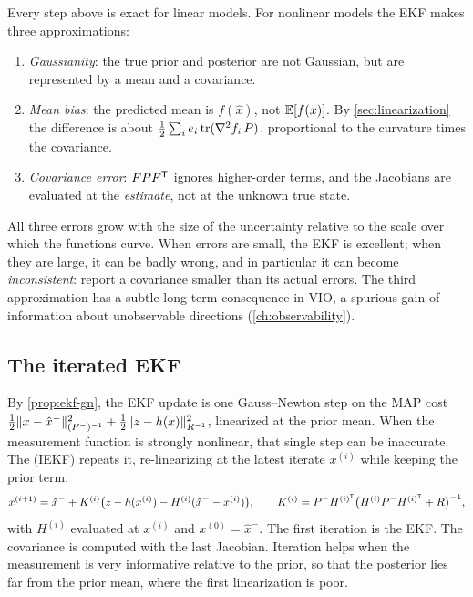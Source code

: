 Every step above is exact for linear models. For nonlinear models the EKF makes three approximations:
\begin{enumerate}
  \item \emph{Gaussianity}: the true prior and posterior are not Gaussian, but are represented by a mean and a covariance.
  \item \emph{Mean bias}: the predicted mean is $f(\hat x)$, not $\mathbb{E}[f(x)]$. By \cref{sec:linearization} the difference is about
        $\tfrac12\sum_ie_i\operatorname{tr}(\nabla^2f_i\,P)$, proportional to the curvature times the covariance.
  \item \emph{Covariance error}: $FPF^{\mathsf{T}}$ ignores higher-order terms, and the Jacobians are evaluated at the \emph{estimate}, not at the unknown true state.
\end{enumerate}
All three errors grow with the size of the uncertainty relative to the scale over which the functions curve. When errors are small, the EKF is
excellent; when they are large, it can be badly wrong, and in particular it can become \emph{inconsistent}: report a covariance smaller than its
actual errors. The third approximation has a subtle long-term consequence in VIO, a spurious gain of information about unobservable directions
(\cref{ch:observability}).

\subsection{The iterated EKF}

By \cref{prop:ekf-gn}, the EKF update is one Gauss--Newton step on the MAP cost $\tfrac12\|x - \hat x^-\|^2_{(P^-)^{-1}} + \tfrac12\|z - h(x)\|^2_{R^{-1}}$, linearized at the prior
mean. When the measurement function is strongly nonlinear, that single step can be inaccurate. The  (IEKF) repeats it,
re-linearizing at the latest iterate $x^{(i)}$ while keeping the prior term:
\begin{equation}
  x^{(i+1)} = \hat x^- + K^{(i)}\big(z - h(x^{(i)}) - H^{(i)}(\hat x^- - x^{(i)})\big), \qquad K^{(i)} = P^-H^{(i)^{\mathsf{T}}}\big(H^{(i)}P^-H^{(i)^{\mathsf{T}}} + R\big)^{-1},
\end{equation}
with $H^{(i)}$ evaluated at $x^{(i)}$ and $x^{(0)} = \hat x^-$. The first iteration is the EKF. The covariance is computed with the last Jacobian. Iteration
helps when the measurement is very informative relative to the prior, so that the posterior lies far from the prior mean, where the first
linearization is poor.


